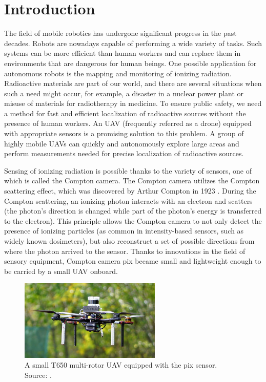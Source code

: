 \chapter{Introduction\label{chap:introduction}}
The field of mobile robotics has undergone significant progress in the past decades.
Robots are nowadays capable of performing a wide variety of tasks. 
Such systems can be more efficient than human workers and can replace them in environments that are dangerous for human beings.
One possible application for autonomous robots is the mapping and monitoring of ionizing radiation. 
Radioactive materials are part of our world, and there are several situations when such a need might occur, for example, a disaster in a nuclear power plant or misuse of materials for radiotherapy in medicine. 
To ensure public safety, we need a method for fast and efficient localization of radioactive sources without the presence of human workers.
An \ac{UAV} (frequently referred as a drone) equipped with appropriate sensors is a promising solution to this problem.
A group of highly mobile \ac{UAV}s can quickly and autonomously explore large areas and perform measurements needed for precise localization of radioactive sources.

Sensing of ionizing radiation is possible thanks to the variety of sensors, one of which is called the Compton camera.
The Compton camera utilizes the Compton scattering effect, which was discovered by Arthur Compton in 1923 \cite{compton}.
During the Compton scattering, an ionizing photon interacts with an electron and scatters (the photon's direction is changed while part of the photon's energy is transferred to the electron).
This principle allows the Compton camera to not only detect the presence of ionizing particles (as common in intensity-based sensors, such as widely known dosimeters), but also reconstruct a set of possible directions from where the photon arrived to the sensor.
Thanks to innovations in the field of sensory equipment, Compton camera \ac{pix} became small and lightweight enough to be carried by a small \ac{UAV} onboard.


\begin{figure}[!h]
    \centering
  \includegraphics[width=0.6\textwidth]{./fig/photos/uav.jpg}
    \caption{A small T650 multi-rotor UAV equipped with the \ac{pix} sensor. Source: \cite{baca2021gamma}.}
    \label{fig:uavvv}
\end{figure}

